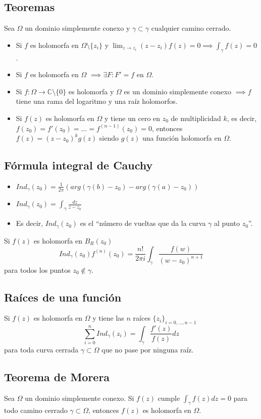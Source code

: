 \documentclass[paper=a4, fontsize=11pt]{scrartcl}
\numberwithin{equation}{section}
\numberwithin{figure}{section}
\numberwithin{table}{section}
\begin{document}
\subsection{Teoremas}
Sea $\Omega$ un dominio simplemente conexo y $\gamma\subset\gamma$ cualquier camino cerrado.
\begin{itemize}
\item Si $f$ es holomorfa en $\Omega\setminus\{z_i\}$ y $\lim_{z\to z_i} (z-z_i)f(z) = 0 \implies \int_{\gamma}f(z) = 0$.
\item Si $f$ es holomorfa en $\Omega$ $\implies \exists F: F'=f$ en $\Omega$.
\item Si $f:\Omega\to\mathbb{C}\setminus\{0\}$ es holomorfa y $\Omega$ es un dominio simplemente conexo $\implies f$ tiene una rama del logaritmo y una raíz holomorfos.
\item Si $f(z)$ es holomorfa en $\Omega$ y tiene un cero en $z_0$ de multiplicidad $k$, es decir, $f(z_0) = f'(z_0) = \hdots = f^{(n-1)}(z_0) = 0$, entonces $f(z) = (z-z_0)^kg(z)$ siendo $g(z)$ una función holomorfa en $\Omega$.
\end{itemize}

\subsection{Fórmula integral de Cauchy}
\begin{itemize}
\item $Ind_\gamma (z_0) = \frac{1}{2\pi}\left(arg(\gamma(b)-z_0)-arg(\gamma(a)-z_0)\right)$
\item $Ind_\gamma (z_0) = \int_\gamma \frac{dz}{z-z_0}$
\item Es decir, $Ind_\gamma (z_0)$ es el ``número de vueltas que da la curva $\gamma$ al punto $z_0$''.
\end{itemize}
Si $f(z)$ es holomorfa en $B_R(z_0)$
$$\boxed{Ind_\gamma(z_0) f^{(n)}(z_0) = \frac{n!}{2\pi i}\int_\gamma \frac{f(w)}{(w-z_0)^{n+1}}}$$
para todos los puntos $z_0\notin \gamma$.

\subsection{Raíces de una función}
Si $f(z)$ es holomorfa en $\Omega$ y tiene las $n$ raíces $\{{z_i}\}_{i=0,\hdots,n-1}$
$$\sum_{i=0}^n Ind_\gamma(z_i) = \int_\gamma \frac{f'(z)}{f(z)}dz$$
para toda curva cerrada $\gamma\subset\Omega$ que no pase por ninguna raíz.

\subsection{Teorema de Morera}
Sea $\Omega$ un dominio simplemente conexo. Si $f(z)$ cumple $\int_{\gamma} f(z)dz = 0$ para todo camino cerrado $\gamma\subset\Omega$, entonces $f(z)$ es holomorfa en $\Omega$.
\end{document}
